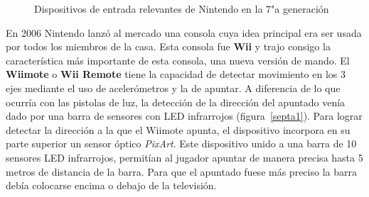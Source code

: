 \begin{figure}[t]
     \hfill
{}
     \caption{Dispositivos de entrada relevantes de Nintendo en la 7"a  generaci\'on}
     \label{fig:septima}
   \end{figure}

En 2006 Nintendo lanz\'o al mercado una consola cuya idea principal era ser usada por todos los miembros de la casa. Esta consola fue \textbf{Wii} y trajo consigo la caracter\'istica m\'as importante de esta consola, una nueva versi\'on de mando. El \textbf{Wiimote} o \textbf{Wii Remote} tiene la capacidad de detectar movimiento en los 3 ejes mediante el uso de aceler\'ometros y la de apuntar. A diferencia de lo que ocurr\'ia con las pistolas de luz, la detecci\'on de la direcci\'on del apuntado ven\'ia dado por una barra de sensores con LED infrarrojos (figura~\ref{septa1}). Para lograr detectar la direcci\'on a la que el Wiimote apunta, el dispositivo incorpora en su parte superior un sensor \'optico \textit{PixArt}. Este dispositivo unido a una barra de 10 sensores LED infrarrojos, permit\'ian al jugador apuntar de manera precisa hasta 5 metros de distancia de la barra. Para que el apuntado fuese m\'as preciso la barra deb\'ia colocarse encima o debajo de la televisi\'on.\\


